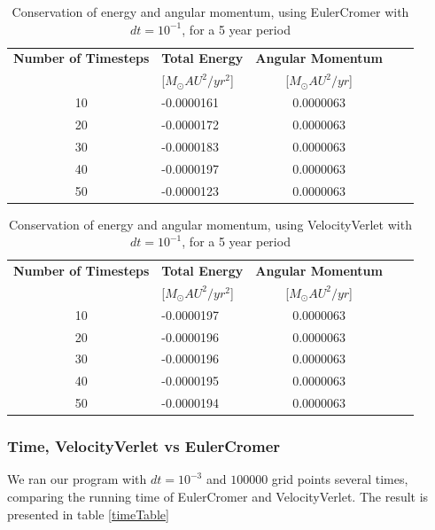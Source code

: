 \documentclass[norsk,a4paper,12pt]{article}
\begin{document}
{\begin{table} [H]
\centering
\caption{Conservation of energy and angular momentum, using EulerCromer with $dt=10^{-1}$, for a 5 year period}
\begin{tabularx}{\textwidth}{cXcXc} \toprule
    {\bf Number of Timesteps} & {\bf Total Energy }& {\bf Angular Momentum} \\
    &[$M_\odot AU^2/yr^2$]&[$M_\odot AU^2/yr$]\\ \hline
    10 & -0.0000161 & 0.0000063\\ \hline
    20 & -0.0000172 & 0.0000063\\ \hline
    30 & -0.0000183 & 0.0000063\\ \hline
    40 & -0.0000197 & 0.0000063\\ \hline
    50 & -0.0000123 & 0.0000063\\ \bottomrule 
\end{tabularx}
\label{euler_dt=10(-1)}
\end{table}

\begin{table} [H]
\centering
\caption{Conservation of energy and angular momentum, using VelocityVerlet with $dt=10^{-1}$, for a 5 year period}
\begin{tabularx}{\textwidth}{cXcXc} \toprule
    {\bf Number of Timesteps} & {\bf Total Energy }& {\bf Angular Momentum} \\
    &[$M_\odot AU^2/yr^2$]&[$M_\odot AU^2/yr$]\\ \hline
    10 & -0.0000197 & 0.0000063\\ \hline
    20 & -0.0000196 & 0.0000063\\ \hline
    30 & -0.0000196 & 0.0000063\\ \hline
    40 & -0.0000195 & 0.0000063\\ \hline
    50 & -0.0000194 & 0.0000063\\ \bottomrule 
\end{tabularx}
\label{verlet_dt=10(-1)}
\end{table}

\subsubsection{Time, VelocityVerlet vs EulerCromer}
We ran our program with $dt = 10^{-3}$ and $100000$ grid points several times, comparing the running time of EulerCromer and VelocityVerlet. The result is presented in table \ref{timeTable}

}
\end{document}
